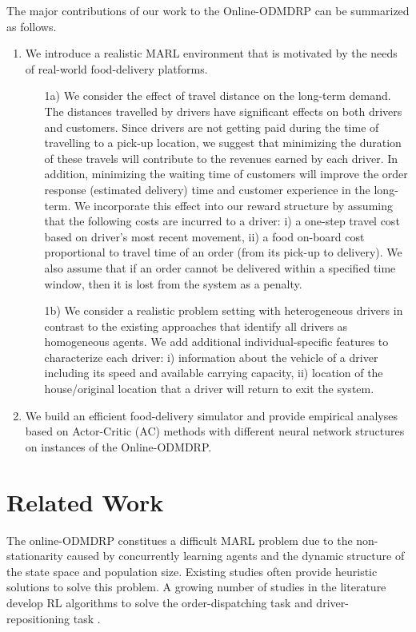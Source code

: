 \documentclass{article}
\theoremstyle{defn}
\theoremstyle{prop}
\theoremstyle{assm}
\theoremstyle{theoremm}
\theoremstyle{remarkk}
\theoremstyle{lem}
\theoremstyle{example}
\theoremstyle{example}
\begin{document}
The major contributions of our work to the Online-ODMDRP can be summarized as follows. 
\begin{enumerate}[leftmargin=*]
    \item We introduce a realistic MARL environment that is motivated by the needs of real-world food-delivery platforms. 
    \begin{enumerate}
    \item[1a)] We consider the effect of travel distance on the long-term demand. The distances travelled by drivers have significant effects on both drivers and customers. Since drivers are not getting paid during the time of travelling to a pick-up location, we suggest that minimizing the duration of these travels will contribute to the revenues earned by each driver. In addition, minimizing the waiting time of customers will improve the order response (estimated delivery) time and customer experience in the long-term. We incorporate this effect into our reward structure by assuming that the following costs are incurred to a driver: i) a one-step travel cost based on driver's most recent movement, ii) a food on-board cost proportional to travel time of an order (from its pick-up to delivery). We also assume that if an order cannot be delivered within a specified time window, then it is lost from the system as a penalty.
    \item[1b)] We consider a realistic problem setting with heterogeneous drivers in contrast to the existing approaches that identify all drivers as homogeneous agents. We add additional individual-specific features to characterize each driver: i) information about the vehicle of a driver including its speed and available carrying capacity, ii) location of the house/original location that a driver will return to exit the system.
\end{enumerate}
    \item We build an efficient food-delivery simulator and provide empirical analyses based on Actor-Critic (AC) methods with different neural network structures on instances of the Online-ODMDRP. 
\end{enumerate}



\section{Related Work}\label{literature}
The online-ODMDRP constitues a difficult MARL problem due to the non-stationarity caused by concurrently learning agents and the dynamic structure of the state space and population size. Existing studies often provide heuristic solutions to solve this problem. A growing number of studies in the literature develop RL algorithms to solve the order-dispatching task \citep[see for example,][]{Li2019, tang2019deep, ke2019optimizing, Zhou2019, yang2020multiagent} and driver-repositioning task \citep[see for example,][]{gao2018optimize, lin2018efficient, yang2018mean, wen2017rebalancing}. 
\end{document}
